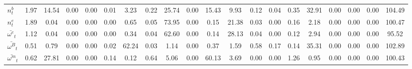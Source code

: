 \begin{center}
\begin{longtable}{lccccccccccccccccccc}
$ n^b_t                     $	 & 	                1.97	 & 	               14.54	 & 	                0.00	 & 	                0.00	 & 	                0.01	 & 	                3.23	 & 	                0.22	 & 	               25.74	 & 	                0.00	 & 	               15.43	 & 	                9.93	 & 	                0.12	 & 	                0.04	 & 	                0.35	 & 	               32.91	 & 	                0.00	 & 	                0.00	 & 	                0.00	 & 	              104.49 \\ 
$ n^e_t                     $	 & 	                1.89	 & 	                0.04	 & 	                0.00	 & 	                0.00	 & 	                0.00	 & 	                0.65	 & 	                0.05	 & 	               73.95	 & 	                0.00	 & 	                0.15	 & 	               21.38	 & 	                0.03	 & 	                0.00	 & 	                0.16	 & 	                2.18	 & 	                0.00	 & 	                0.00	 & 	                0.00	 & 	              100.47 \\ 
$ \bar{\omega^e}_t          $	 & 	                1.12	 & 	                0.04	 & 	                0.00	 & 	                0.00	 & 	                0.00	 & 	                0.34	 & 	                0.04	 & 	               62.60	 & 	                0.00	 & 	                0.14	 & 	               28.13	 & 	                0.04	 & 	                0.00	 & 	                0.12	 & 	                2.94	 & 	                0.00	 & 	                0.00	 & 	                0.00	 & 	               95.52 \\ 
$ \bar{\omega^B}_t          $	 & 	                0.51	 & 	                0.79	 & 	                0.00	 & 	                0.00	 & 	                0.02	 & 	               62.24	 & 	                0.03	 & 	                1.14	 & 	                0.00	 & 	                0.37	 & 	                1.59	 & 	                0.58	 & 	                0.17	 & 	                0.14	 & 	               35.31	 & 	                0.00	 & 	                0.00	 & 	                0.00	 & 	              102.89 \\ 
$ \bar{\omega^m}_t          $	 & 	                0.62	 & 	               27.81	 & 	                0.00	 & 	                0.00	 & 	                0.14	 & 	                0.12	 & 	                0.64	 & 	                5.06	 & 	                0.00	 & 	               60.13	 & 	                3.69	 & 	                0.00	 & 	                0.00	 & 	                1.26	 & 	                0.95	 & 	                0.00	 & 	                0.00	 & 	                0.00	 & 	              100.43 \\ 

\end{longtable}
\end{center}
